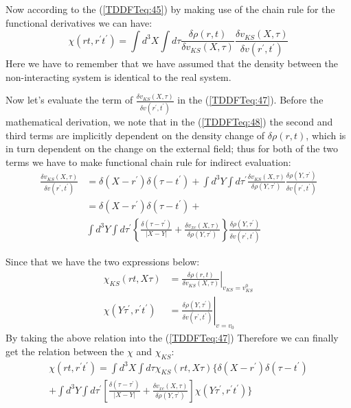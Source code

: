 Now according to the (\ref{TDDFTeq:45}) by making use of the chain
rule for the functional derivatives we can have:
\begin{equation}\label{TDDFTeq:47}
\chi(rt, r^{'}t^{'}) = \int d^{3}X\int d\tau
\frac{\delta\rho(r,t)}{\delta v_{KS}(X,\tau)}\frac{\delta
v_{KS}(X,\tau)}{\delta v(r^{'},t^{'})}
\end{equation}
Here we have to remember that we have assumed that the density
between the non-interacting system is identical to the real system.

Now let's evaluate the term of $\frac{\delta v_{KS}(X,\tau)}{\delta
v(r^{'},t^{'})}$ in the (\ref{TDDFTeq:47}). Before the mathematical
derivation, we note that in the (\ref{TDDFTeq:48}) the second and
third terms are implicitly dependent on the density change of
$\delta\rho(r,t)$, which is in turn dependent on the change on the
external field; thus for both of the two terms we have to make
functional chain rule for indirect evaluation:
\begin{align}\label{}
\frac{\delta v_{KS}(X,\tau)}{\delta v(r^{'},t^{'})} &=\delta
(X-r^{'})\delta(\tau-t^{'}) + \int d^{3}Y\int d\tau^{'}\frac{\delta
v_{KS}(X,\tau)}{\delta \rho(Y,\tau^{'})}\frac{\delta
\rho(Y,\tau^{'})}{\delta v(r^{'},t^{'})} \nonumber \\
&=\delta (X-r^{'})\delta(\tau-t^{'}) + \nonumber \\
&\int d^{3}Y\int d\tau^{'}\left\{\frac{\delta(\tau-\tau^{'})}{|X-Y|}
+ \frac{\delta v_{xc}(X,\tau)}{\delta
\rho(Y,\tau^{'})}\right\}\frac{\delta \rho(Y,\tau^{'})}{\delta
v(r^{'},t^{'})}
\end{align}

Since that we have the two expressions below:
\begin{align}\label{}
 \chi_{KS}(rt,
X\tau) &=\left.\frac{\delta\rho(r,t)}{\delta v_{KS}(X,\tau)}
\right|_{v_{KS}=v_{KS}^{0}} \nonumber \\
 \chi(Y\tau^{'},
r^{'}t^{'}) &= \left.\frac{\delta \rho(Y,\tau^{'})}{\delta
v(r^{'},t^{'})}\right|_{v=v_{0}}
\end{align}
By taking the above relation into the (\ref{TDDFTeq:47}) Therefore
we can finally get the relation between the $\chi$ and $\chi_{KS}$:
\begin{multline}\label{TDDFTeq:49}
\chi(rt, r^{'}t^{'}) = \int d^{3}X\int d\tau  \chi_{KS}(rt, X\tau)
\Bigg\{\delta (X-r^{'})\delta(\tau-t^{'})  \\
+ \int d^{3}Y\int d\tau^{'}\left[\frac{\delta(\tau-\tau^{'})}{|X-Y|}
+ \frac{\delta v_{xc}(X,\tau)}{\delta
\rho(Y,\tau^{'})}\right]\chi(Y\tau^{'}, r^{'}t^{'}) \Bigg\}
\end{multline}

